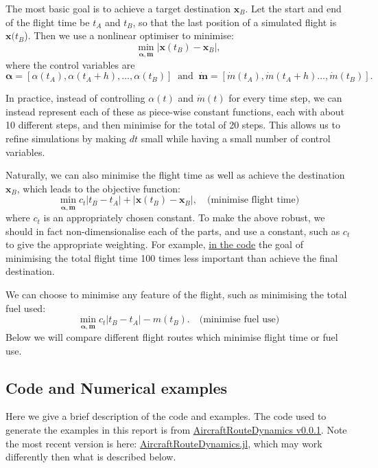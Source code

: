 \documentclass{article}
\renewcommand{\vec}[1]{\boldsymbol{#1}}
\begin{document}
The most basic goal is to achieve a target destination $\vec x_B$. Let the start and end of the flight time be $t_A$ and $t_B$, so that the last position of a simulated flight is $\vec x(t_B$). Then we use a nonlinear optimiser to minimise:
\[
\min_{\vec \alpha, \dot{\vec m}} | \vec x(t_B) - \vec x_B|,
\]
where the control variables are
\[
\vec \alpha = [\alpha(t_A), \alpha(t_A+h), \ldots, \alpha(t_B)] \;\; \text{and} \;\; 
\dot{\vec m} = [\dot m(t_A), \dot m(t_A+h) \ldots, \dot m(t_B)].
\]

In practice, instead of controlling $\alpha(t)$ and $\dot m(t)$ for every time step, we can instead represent each of these as piece-wise constant functions, each with about 10 different steps, and then minimise for the total of 20 steps. This allows us to refine simulations by making $dt$ small while having a small number of control variables.

Naturally, we can also minimise the flight time as well as achieve the destination $\vec x_B$, which leads to the objective function:
\begin{equation} \label{eqn:objective-flight-time}
    \min_{\vec \alpha, \dot{\vec m}} c_t | t_B - t_A| + | \vec x(t_B) - \vec x_B|, \quad \text{(minimise flight time)}
\end{equation}
where $c_t$ is an appropriately chosen constant. To make the above robust, we should in fact non-dimensionalise each of the parts, and use a constant, such as $c_t$ to give the appropriate weighting. For example, \href{https://github.com/arturgower/AircraftRouteDynamics.jl/blob/354db5b80cef8d20cd8fcf031ec3f446823477eb/src/equations-motion.jl#L168}{in the code} the goal of minimising the total flight time 100 times less important than achieve the final destination.

We can choose to minimise any feature of the flight, such as minimising the total fuel used:
\begin{equation} \label{eqn:objective-fuel-use}
    \min_{\vec \alpha, \dot{\vec m}} c_t | t_B - t_A| - m(t_B). \quad \text{(minimise fuel use)}
\end{equation}
Below we will compare different flight routes which minimise flight time or fuel use.

\subsection{Code and Numerical examples}
Here we give a brief description of the code \cite{gower2025AircraftRouteDynamics} and examples. The code used to generate the examples in this report is from \href{https://github.com/arturgower/AircraftRouteDynamics.jl/tree/v0.0.1}{AircraftRouteDynamics v0.0.1}. Note the most recent version is here: \href{https://github.com/arturgower/AircraftRouteDynamics.jl/tree/main}{AircraftRouteDynamics.jl}, which may work differently then what is described below.
\end{document}
